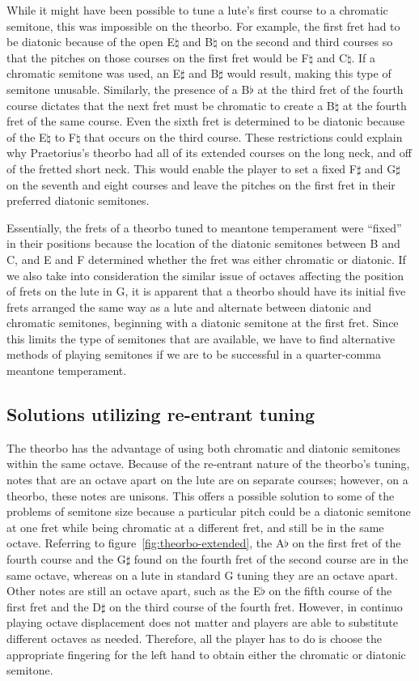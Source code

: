 While it might have been possible to tune a lute's first course to a chromatic semitone,
this was impossible on the theorbo. For example, the first fret had to be diatonic because
of the open E$\natural$ and B$\natural$ on the second and third courses so that the
pitches on those courses on the first fret would be F$\natural$ and C$\natural$.  If a
chromatic semitone was used, an E$\sharp$ and B$\sharp$ would result, making this type of
semitone unusable. Similarly, the presence of a B$\flat$ at the third fret of the fourth
course dictates that the next fret must be chromatic to create a B$\natural$ at the fourth
fret of the same course. Even the sixth fret is determined to be diatonic because of the
E$\natural$ to F$\natural$ that occurs on the third course.  These restrictions could
explain why Praetorius's theorbo had all of its extended courses on the long neck, and
off of the fretted short neck.  This would enable the player to set a fixed F$\sharp$ and 
G$\sharp$ on the seventh and eight courses and leave the pitches on the first fret in
their preferred diatonic semitones. 

Essentially, the frets of a theorbo tuned to meantone temperament were ``fixed'' in
their positions because the location of the diatonic semitones between B and C, and E
and F determined whether the fret was either chromatic or diatonic.  If we also take into
consideration the similar issue of octaves affecting the position of frets on the lute
in G, it is apparent that a theorbo should have its initial five frets arranged the
same way as a lute and alternate between diatonic and chromatic semitones, beginning
with a diatonic semitone at the first fret.  Since this limits the type of semitones
that are available, we have to find alternative methods of playing semitones if we are
to be successful in a quarter-comma meantone temperament.

\subsection{Solutions utilizing re-entrant tuning}

The theorbo has the advantage of using both chromatic and diatonic semitones within
the same octave.  Because of the re-entrant nature of the theorbo's tuning, notes that
are an octave apart on the lute are on separate courses; however, on a theorbo, these
notes are unisons. This offers a possible solution to some of the problems of semitone
size because a particular pitch could be a diatonic semitone at one fret while being
chromatic at a different fret, and still be in the same octave. Referring to
figure~\ref{fig:theorbo-extended}, the A$\flat$ on the first fret of the fourth course
and the G$\sharp$ found on the fourth fret of the second course are in the same octave,
whereas on a lute in standard G tuning they are an octave apart. Other notes are still
an octave apart, such as the E$\flat$ on the fifth course of the first fret and the
D$\sharp$ on the third course of the fourth fret.  However, in continuo playing octave
displacement does not matter and players are able to substitute different
octaves as needed. Therefore, all the player has to do is choose the appropriate
fingering for the left hand to obtain either the chromatic or diatonic semitone.


